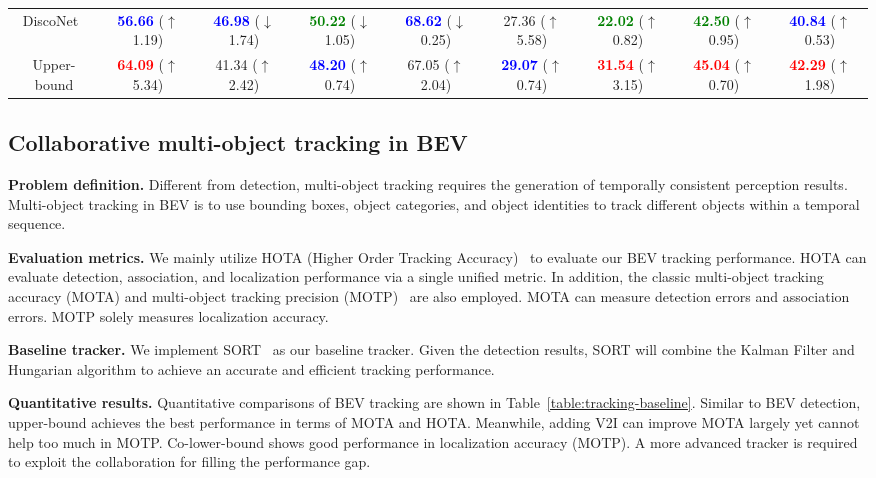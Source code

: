 \begin{table*}[t]
{\begin{tabular}{@{}ccccccccc@{}}
DiscoNet~\cite{Li_2021_NeurIPS} & \textbf{\textcolor{blue}{56.66}} ($\uparrow$1.19) & \textbf{\textcolor{blue}{46.98}} ($\downarrow$1.74) & \textbf{\textcolor{green}{50.22}} ($\downarrow$1.05) & \textbf{\textcolor{blue}{68.62}} ($\downarrow$0.25) & 27.36 ($\uparrow$5.58) & \textbf{\textcolor{green}{22.02}} ($\uparrow$0.82) & \textbf{\textcolor{green}{42.50}} ($\uparrow$0.95) & \textbf{\textcolor{blue}{40.84}} ($\uparrow$0.53) \\ 
Upper-bound & \textbf{\textcolor{red}{64.09}} ($\uparrow$5.34) & 41.34 ($\uparrow$2.42) & \textbf{\textcolor{blue}{48.20}} ($\uparrow$0.74) & 67.05 ($\uparrow$2.04) & \textbf{\textcolor{blue}{29.07}} ($\uparrow$0.74) & \textbf{\textcolor{red}{31.54}} ($\uparrow$3.15) & \textbf{\textcolor{red}{45.04}} ($\uparrow$0.70) & \textbf{\textcolor{red}{42.29}} ($\uparrow$1.98)\\
\bottomrule
\end{tabular}}
\vspace{-5mm}
\end{table*}

\subsection{Collaborative multi-object tracking in BEV}
\textbf{Problem definition.}
Different from detection, multi-object tracking requires the generation of temporally consistent perception results. Multi-object tracking in BEV is to use bounding boxes, object categories, and object identities to track different objects within a temporal sequence. 

\textbf{Evaluation metrics.} 
We mainly utilize HOTA (Higher Order Tracking Accuracy)~\cite{Luiten_2020} to evaluate our BEV tracking performance. HOTA can evaluate detection, association, and
localization performance via a single unified metric. In addition, the classic multi-object tracking accuracy (MOTA) and multi-object tracking precision (MOTP)~\cite{journals/ejivp/BernardinS08} are also employed. MOTA can measure detection errors and association errors. MOTP solely measures localization accuracy. 

\textbf{Baseline tracker.} 
We implement SORT~\cite{Bewley2016_sort} as our baseline tracker. Given the detection results, SORT will combine the Kalman Filter and Hungarian algorithm to achieve an accurate and efficient tracking performance. 

\textbf{Quantitative results.} Quantitative comparisons of BEV tracking are shown in Table~\ref{table:tracking-baseline}. Similar to BEV detection, upper-bound achieves the best performance in terms of MOTA and HOTA. Meanwhile, adding V2I can improve MOTA largely yet cannot help too much in MOTP. Co-lower-bound shows good performance in localization accuracy (MOTP). A more advanced tracker is required to exploit the collaboration for filling the performance gap.

